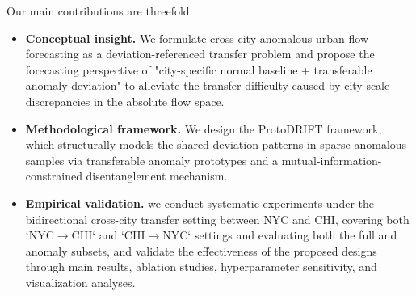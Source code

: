 Our main contributions are threefold.

\begin{itemize}
    \item \textbf{Conceptual insight.} We formulate cross-city anomalous urban flow forecasting as a deviation-referenced transfer problem and propose the forecasting perspective of "city-specific normal baseline + transferable anomaly deviation" to alleviate the transfer difficulty caused by city-scale discrepancies in the absolute flow space.
    \item \textbf{Methodological framework.} We design the ProtoDRIFT framework, which structurally models the shared deviation patterns in sparse anomalous samples via transferable anomaly prototypes and a mutual-information-constrained disentanglement mechanism. 
    \item \textbf{Empirical validation.} we conduct systematic experiments under the bidirectional cross-city transfer setting between NYC and CHI, covering both `NYC$\rightarrow$CHI` and `CHI$\rightarrow$NYC` settings and evaluating both the full and anomaly subsets, and validate the effectiveness of the proposed designs through main results, ablation studies, hyperparameter sensitivity, and visualization analyses.
\end{itemize}